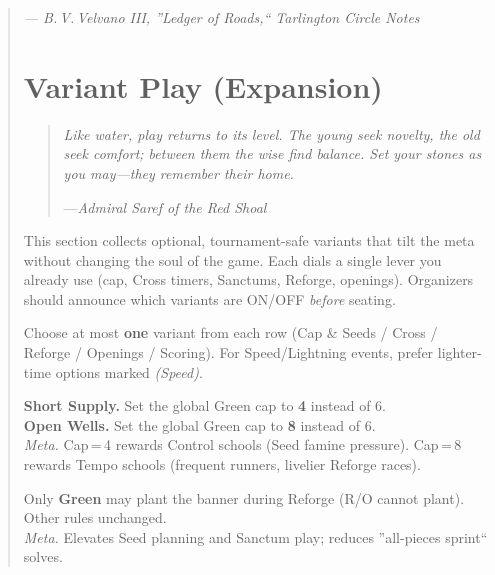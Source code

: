 \documentclass[11pt]{article}
\begin{document}
\begin{quote}
\begin{tcolorbox}[enhanced,breakable,
  colback=royal!3, colframe=royal!70!black, boxrule=0.6pt,
  title={Fenwood's Memorandum on the Canray Theory}]
\begin{enumerate}[leftmargin=\textit{,itemsep=0.5em,label=\textbf{Thesis \Roman}.}]
\end{enumerate}

\raggedleft\emph{--- B.\,V.\,Velvano III, ''Ledger of Roads,`` Tarlington Circle Notes}\par
\end{tcolorbox}

\clearpage

\section{Variant Play (Expansion)}
\label{sec:variant-play}

\begin{quote}\small\itshape
Like water, play returns to its level. The young seek novelty, the old seek comfort; between them the wise find balance. Set your stones as you may---they remember their home.
\par\hfill---\textit{Admiral Saref of the Red Shoal}
\end{quote}

\noindent
This section collects optional, tournament-safe variants that tilt the meta without changing the soul of the game. Each dials a single lever you already use (cap, Cross timers, Sanctums, Reforge, openings). Organizers should announce which variants are ON/OFF \emph{before} seating.

\medskip
\begin{tcolorbox}[enhanced,colback=royal!3,colframe=royal!70!black,boxrule=0.6pt,title={How to Use These},breakable]
\small
Choose at most \textbf{one} variant from each row (Cap \& Seeds / Cross / Reforge / Openings / Scoring). For Speed/Lightning events, prefer lighter-time options marked \emph{(Speed)}.
\end{tcolorbox}

\begin{rulevariant}[title={Short Supply / Open Wells (Green Cap Dials)}]
\textbf{Short Supply.} Set the global Green cap to \textbf{4} instead of 6.\\
\textbf{Open Wells.} Set the global Green cap to \textbf{8} instead of 6.\\[0.3em]
\textit{Meta.} Cap\,=\,4 rewards Control schools (Seed famine pressure). Cap\,=\,8 rewards Tempo schools (frequent runners, livelier Reforge races).
\end{rulevariant}

\begin{rulevariant}[title={Greens-Only Plant (Runner Restriction)}]
Only \textbf{Green} may plant the banner during Reforge (R/O cannot plant). Other rules unchanged.\\
\textit{Meta.} Elevates Seed planning and Sanctum play; reduces ''all-pieces sprint`` solves.
\end{rulevariant}


\end{quote}
\end{document}
